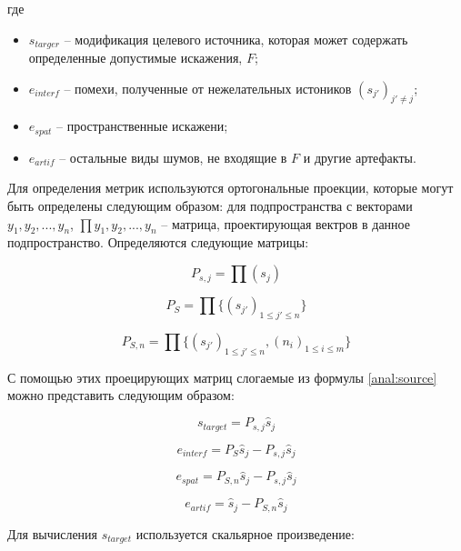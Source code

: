 где

\begin{itemize}
	\item $s_{targer}$ -- модификация целевого источника, которая может содержать определенные допустимые искажения, $F$;
	\item $e_{interf}$ -- помехи, полученные от нежелательных истоников $(s_{j'})_{j' \neq j}$;
	\item $e_{spat}$ -- пространственные искажени;
	\item $e_{artif}$ -- остальные виды шумов, не входящие в $F$ и другие артефакты.
\end{itemize}

Для определения метрик используются ортогональные проекции, которые могут быть определены следующим образом: для подпространства с векторами $y_1, y_2, ... , y_n$, $\prod{y_1, y_2, ... , y_n}$ -- матрица, проектирующая вектров в данное подпространство. Определяются следующие матрицы:

\begin{equation}
P_{s,j} = \prod(s_j)
\end{equation}

\begin{equation}
P_{S} = \prod\{(s_{j'})_{1\le j' \le n}\}
\end{equation}

\begin{equation}
P_{S, n} = \prod\{(s_{j'})_{1\le j' \le n}, (n_i)_{1 \le i \le m} \}
\end{equation}

С помощью этих проецирующих матриц слогаемые из формулы \ref{anal:source} можно представить следующим образом:

\begin{equation}
	s_{target} = P_{s,j} \hat{s}_j
\end{equation}

\begin{equation}
e_{interf} = P_{S} \hat{s}_j - P_{s,j} \hat{s}_j
\end{equation}

\begin{equation}
e_{spat} = P_{S, n} \hat{s}_j - P_{s,j} \hat{s}_j
\end{equation}

\begin{equation}
e_{artif} = \hat{s}_j - P_{S, n} \hat{s}_j
\end{equation}

Для вычисления $s_{target}$ используется скальярное произведение:

